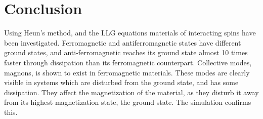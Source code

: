 \documentclass{article}
\begin{document}
    \section*{Conclusion}
    Using Heun's method, and the LLG equations materials of interacting spins have been investigated. Ferromagnetic and antiferromagnetic states have different ground states, and anti-ferromagnetic reaches its ground state almost 10 times faster through dissipation than its ferromagnetic counterpart. Collective modes, magnons, is shown to exist in ferromagnetic materials. These modes are clearly visible in systems which are disturbed from the ground state, and has some dissipation. They affect the magnetization of the material, as they disturb it away from its highest magnetization state, the ground state. The simulation confirms this. 

    \printbibliography
\end{document}
